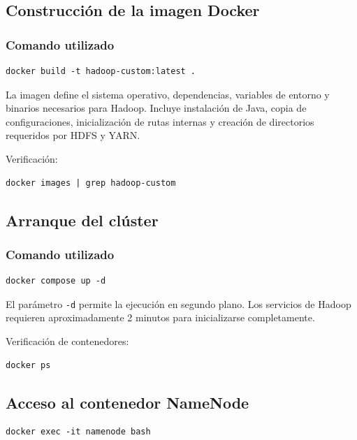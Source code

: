 \subsection{Construcción de la imagen Docker}

\subsubsection*{Comando utilizado}

\begin{verbatim}
docker build -t hadoop-custom:latest .
\end{verbatim}

La imagen define el sistema operativo, dependencias, variables de entorno y binarios necesarios para Hadoop. Incluye instalación de Java, copia de configuraciones, inicialización de rutas internas y creación de directorios requeridos por HDFS y YARN.

Verificación:

\begin{verbatim}
docker images | grep hadoop-custom
\end{verbatim}

\subsection{Arranque del clúster}

\subsubsection*{Comando utilizado}

\begin{verbatim}
docker compose up -d
\end{verbatim}

El parámetro \verb|-d| permite la ejecución en segundo plano. Los servicios de Hadoop requieren aproximadamente 2 minutos para inicializarse completamente.

Verificación de contenedores:

\begin{verbatim}
docker ps
\end{verbatim}

\subsection{Acceso al contenedor NameNode}

\begin{verbatim}
docker exec -it namenode bash
\end{verbatim}

